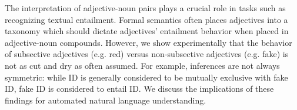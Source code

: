 The interpretation of adjective-noun pairs plays a crucial role in tasks such as recognizing textual entailment. Formal semantics often places adjectives into a taxonomy which should dictate adjectives' entailment behavior when placed in adjective-noun compounds.  However, we show experimentally that the behavior of subsective adjectives (e.g. red) versus non-subsective adjectives (e.g. fake) is not as cut and dry as often assumed. For example, inferences are not always symmetric: while ID is generally considered to be mutually exclusive with fake ID, fake ID is considered to entail ID. We discuss the implications of these findings for automated natural language understanding.
